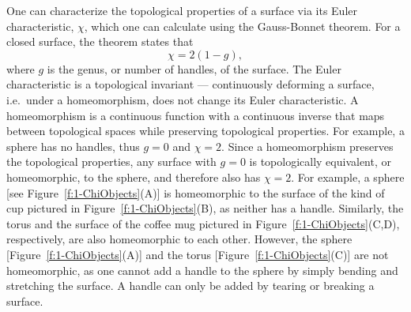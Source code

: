 One can characterize the topological properties of a surface via its Euler characteristic, $\chi$, which one can calculate using the Gauss-Bonnet theorem.
For a closed surface, the theorem states that~\cite{RN23}
\begin{equation}
  \chi = 2(1-g),\label{e:1-GB1}
\end{equation}
where $g$ is the genus, or number of handles, of the surface.
The Euler characteristic is a topological invariant --- continuously deforming a surface, i.e.\ under a homeomorphism, does not change its Euler characteristic.
A homeomorphism is a continuous function with a continuous inverse that maps between topological spaces while preserving topological properties.
For example, a sphere has no handles, thus $g = 0$ and $\chi=2$.
Since a homeomorphism preserves the topological properties, any surface with $g=0$ is topologically equivalent, or homeomorphic, to the sphere, and therefore also has $\chi=2$.
For example, a sphere [see Figure~\ref{f:1-ChiObjects}(A)] is homeomorphic to the surface of the kind of cup pictured in Figure~\ref{f:1-ChiObjects}(B), as neither has a handle.
Similarly, the torus and the surface of the coffee mug pictured in Figure~\ref{f:1-ChiObjects}(C,D), respectively, are also homeomorphic to each other.
However, the sphere [Figure~\ref{f:1-ChiObjects}(A)] and the torus [Figure~\ref{f:1-ChiObjects}(C)] are not homeomorphic, as one cannot add a handle to the sphere by simply bending and stretching the surface.
A handle can only be added by tearing or breaking a surface.

